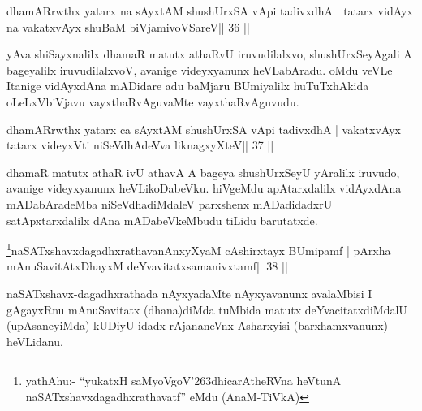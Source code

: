 
\begin{shl}
dhamARrwthx yatarx na sAyxtAM shushUrxSA vA\s pi tadivxdhA |
tatarx vidAyx na vakatxvAyx shuBaM biVjamivoVSareV\hfill || 36 ||
\end{shl}

\begin{artha}
yAva shiSayxnalilx dhamaR matutx athaRvU iruvudilalxvo, shushUrxSeyAgali A bageyalilx iruvudilalxvoV, avanige videyxyanunx heVLabAradu. oMdu veVLe Itanige vidAyxdAna mADidare adu baMjaru BUmiyalilx huTuTxhAkida oLeLxVbiVjavu vayxthaRvAguvaMte vayxthaRvAguvudu.
\end{artha} 
 

\begin{shl}
dhamARrwthx yatarx ca sAyxtAM shushUrxSA vA\s pi tadivxdhA |
vakatxvAyx tatarx videyxVti niSeVdhAdeVva liknagxyXteV\hfill || 37 ||
\end{shl}

\begin{artha}
dhamaR matutx athaR ivU athavA A bageya shushUrxSeyU yAralilx iruvudo,  avanige videyxyanunx heVLikoDabeVku. hiVgeMdu apAtarxdalilx vidAyxdAna mADabAradeMba niSeVdhadiMdaleV parxshenx mADadidadxrU satApxtarxdalilx dAna mADabeVkeMbudu tiLidu barutatxde.
\end{artha}


\begin{shl}
\footnote{yathAhu:- ``yukatxH saMyoVgoV\char'263dhicarAtheRVna  heVtunA naSATxshavxdagadhxrathavatf'' eMdu (AnaM-TiVkA)}naSATxshavxdagadhxrathavanAnxyXyaM cA\s\s shirxtayx BUmipamf |
pArxha mAnuSavitAtxDhayxM deYvavitatxsamanivxtamf\hfill || 38 ||
\end{shl}

\begin{artha}
naSATxshavx-dagadhxrathada nAyxyadaMte nAyxyavanunx avalaMbisi I gAgayxRnu mAnuSavitatx (dhana)diMda tuMbida matutx deYvacitatxdiMdalU (upAsaneyiMda) kUDiyU idadx rAjananeVnx Asharxyisi (barxhamxvanunx) heVLidanu.
\end{artha}


